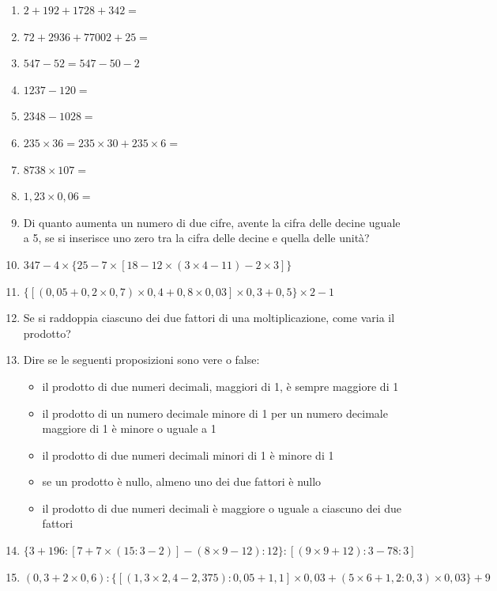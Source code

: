 \documentclass[]{article}
\newcommand*\vf {\hspace*{0em plus 1fill}\makebox{V \quad F}}
\newcommand*\result[1] {\hspace*{0em plus 1fill}{\footnotesize \makebox{[#1]}}}
\begin{document}
\begin{enumerate}
	\item \quad \(2 + 192 + 1728 + 342 = \)
	\item \quad \(72 + 2936 + 77002 + 25 = \)
	\item \quad \(547 - 52 = 547 - 50 - 2\)
	\item \quad \(1237 - 120 = \)
	\item \quad \(2348 - 1028 = \)
	\item \quad \(235 \times 36 = 235 \times 30 + 235 \times 6 = \)
	\item \quad \(8738 \times 107 = \)
	\item \quad \(1,23 \times 0,06 = \)
	\item {Di quanto aumenta un numero di due cifre, avente la cifra delle decine uguale a 5, se si inserisce uno zero tra la cifra delle decine e quella delle unità?}
	\item \quad \(347 - 4 \times \{ 25 - 7 \times [ 18 - 12 \times ( 3 \times 4 - 11 ) - 2 \times 3 ] \} \) \result{247}
	\item \quad \(\{ [ ( 0,05 + 0,2 \times 0,7 ) \times 0,4 + 0,8 \times 0,03] \times 0,3 + 0,5 \} \times 2 - 1 \) \result{0,06}
	\item {Se si raddoppia ciascuno dei due fattori di una moltiplicazione, come varia il prodotto?}
	\item {Dire se le seguenti proposizioni sono vere o false:
	\begin{itemize}
		\item {il prodotto di due numeri decimali, maggiori di 1, è sempre maggiore di 1} \vf
		\item {il prodotto di un numero decimale minore di 1 per un numero decimale \\ maggiore di 1 è minore o uguale a 1} \vf
		\item {il prodotto di due numeri decimali minori di 1 è minore di 1} \vf
		\item {se un prodotto è nullo, almeno uno dei due fattori è nullo} \vf
		\item {il prodotto di due numeri decimali è maggiore o uguale a ciascuno dei due fattori} \vf
	\end{itemize}
	}

	\item \quad \( \{ 3 + 196 : [7+7\times(15:3-2)]-(8\times9-12):12 \}:[(9\times9+12):3-78:3] \) \result{1}
	
	\item \quad \((0,3+2\times0,6):\{[(1,3\times2,4-2,375):0,05+1,1]\times0,03+(5\times6+1,2:0,3)\times0,03\}+9\) \result{10}
	

\end{enumerate}
\end{document}
